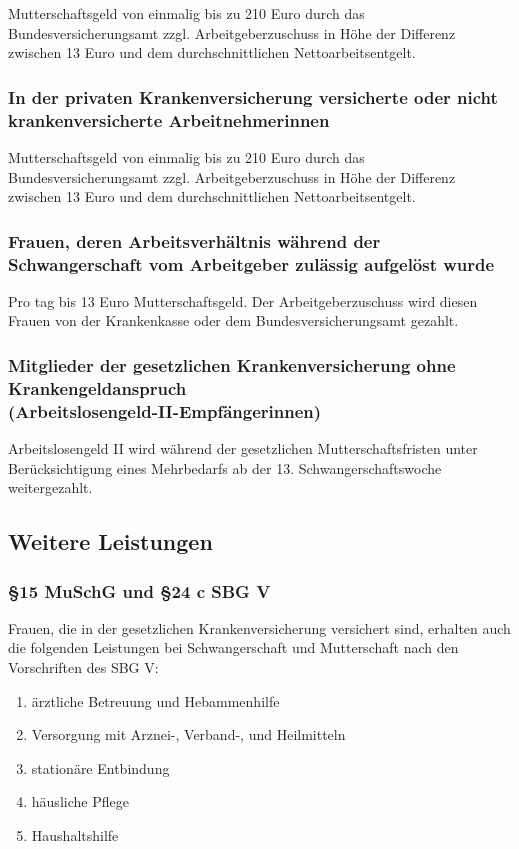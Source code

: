 \documentclass[a4paper, 12pt]{report}
\begin{document}
Mutterschaftsgeld von einmalig bis zu 210 Euro durch das Bundesversicherungsamt
zzgl. Arbeitgeberzuschuss in Höhe der Differenz zwischen 13 Euro und dem 
durchschnittlichen Nettoarbeitsentgelt. 

\subsubsection{In der privaten Krankenversicherung versicherte oder nicht 
krankenversicherte Arbeitnehmerinnen}

Mutterschaftsgeld von einmalig bis zu 210 Euro durch das Bundesversicherungsamt
zzgl. Arbeitgeberzuschuss in Höhe der Differenz zwischen 13 Euro und dem 
durchschnittlichen Nettoarbeitsentgelt. 

\subsubsection{Frauen, deren Arbeitsverhältnis während der Schwangerschaft vom 
Arbeitgeber zulässig aufgelöst wurde}

Pro tag bis 13 Euro Mutterschaftsgeld. Der Arbeitgeberzuschuss wird diesen 
Frauen von der Krankenkasse oder dem Bundesversicherungsamt gezahlt. 

\subsubsection{Mitglieder der gesetzlichen Krankenversicherung ohne 
Krankengeldanspruch \\ (Arbeitslosengeld-II-Empfängerinnen)}

Arbeitslosengeld II wird während der gesetzlichen Mutterschaftsfristen unter 
Berücksichtigung eines Mehrbedarfs ab der 13. Schwangerschaftswoche 
weitergezahlt. 

\newpage
\subsection{Weitere Leistungen}

\subsubsection{\S 15 MuSchG und \S 24 c SBG V}

Frauen, die in der gesetzlichen Krankenversicherung versichert sind, erhalten 
auch die folgenden Leistungen bei Schwangerschaft und Mutterschaft nach den 
Vorschriften des SBG V:

\begin{enumerate}
    \item ärztliche Betreuung und Hebammenhilfe
    \item Versorgung mit Arznei-, Verband-, und Heilmitteln
    \item stationäre Entbindung
    \item häusliche Pflege 
    \item Haushaltshilfe
\end{enumerate}
\end{document}
